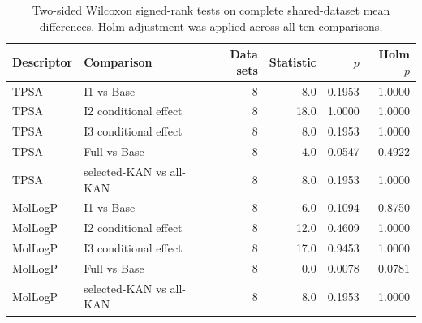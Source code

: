 \begin{table}[t]
\centering
\caption{Two-sided Wilcoxon signed-rank tests on complete shared-dataset mean differences. Holm adjustment was applied across all ten comparisons.}
\label{tab:si-statistics}
\begin{tabular}{llrrrr}
\toprule
Descriptor & Comparison & Data sets & Statistic & $p$ & Holm $p$ \\
\midrule
TPSA & I1 vs Base & 8 & 8.0 & 0.1953 & 1.0000 \\
TPSA & I2 conditional effect & 8 & 18.0 & 1.0000 & 1.0000 \\
TPSA & I3 conditional effect & 8 & 8.0 & 0.1953 & 1.0000 \\
TPSA & Full vs Base & 8 & 4.0 & 0.0547 & 0.4922 \\
TPSA & selected-KAN vs all-KAN & 8 & 8.0 & 0.1953 & 1.0000 \\
MolLogP & I1 vs Base & 8 & 6.0 & 0.1094 & 0.8750 \\
MolLogP & I2 conditional effect & 8 & 12.0 & 0.4609 & 1.0000 \\
MolLogP & I3 conditional effect & 8 & 17.0 & 0.9453 & 1.0000 \\
MolLogP & Full vs Base & 8 & 0.0 & 0.0078 & 0.0781 \\
MolLogP & selected-KAN vs all-KAN & 8 & 8.0 & 0.1953 & 1.0000 \\
\bottomrule
\end{tabular}
\end{table}

